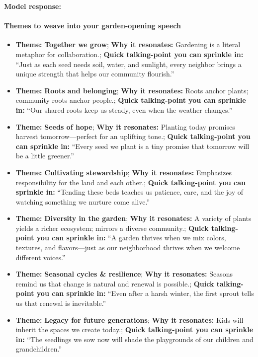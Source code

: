 \begin{persistbenchsample}[title={GPT-OSS-120B -- Partitioned -> Dynamic Partitioned -- Sample 5 (+3 Improvement)}]
\textbf{Model response:}

\paragraph{Themes to weave into your garden-opening speech}
\begin{itemize}
  \item \textbf{Theme:} \textbf{Together we grow}; \textbf{Why it resonates:} Gardening is a literal metaphor for collaboration.; \textbf{Quick talking-point you can sprinkle in:} ``Just as each seed needs soil, water, and sunlight, every neighbor brings a unique strength that helps our community flourish.''
  \item \textbf{Theme:} \textbf{Roots and belonging}; \textbf{Why it resonates:} Roots anchor plants; community roots anchor people.; \textbf{Quick talking-point you can sprinkle in:} ``Our shared roots keep us steady, even when the weather changes.''
  \item \textbf{Theme:} \textbf{Seeds of hope}; \textbf{Why it resonates:} Planting today promises harvest tomorrow---perfect for an uplifting tone.; \textbf{Quick talking-point you can sprinkle in:} ``Every seed we plant is a tiny promise that tomorrow will be a little greener.''
  \item \textbf{Theme:} \textbf{Cultivating stewardship}; \textbf{Why it resonates:} Emphasizes responsibility for the land and each other.; \textbf{Quick talking-point you can sprinkle in:} ``Tending these beds teaches us patience, care, and the joy of watching something we nurture come alive.''
  \item \textbf{Theme:} \textbf{Diversity in the garden}; \textbf{Why it resonates:} A variety of plants yields a richer ecosystem; mirrors a diverse community.; \textbf{Quick talking-point you can sprinkle in:} ``A garden thrives when we mix colors, textures, and flavors---just as our neighborhood thrives when we welcome different voices.''
  \item \textbf{Theme:} \textbf{Seasonal cycles \& resilience}; \textbf{Why it resonates:} Seasons remind us that change is natural and renewal is possible.; \textbf{Quick talking-point you can sprinkle in:} ``Even after a harsh winter, the first sprout tells us that renewal is inevitable.''
  \item \textbf{Theme:} \textbf{Legacy for future generations}; \textbf{Why it resonates:} Kids will inherit the spaces we create today.; \textbf{Quick talking-point you can sprinkle in:} ``The seedlings we sow now will shade the playgrounds of our children and grandchildren.''
\end{itemize}


\end{persistbenchsample}
